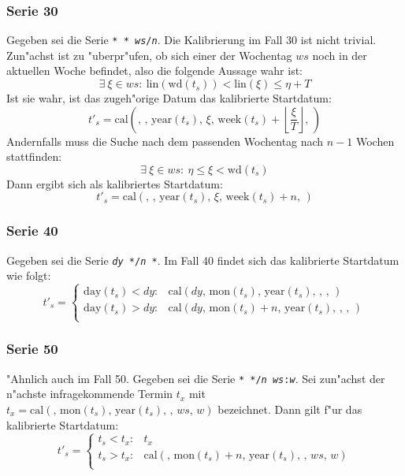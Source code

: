 \documentclass[a4paper]{article}
\newcommand*{\dayf}{\mathrm{day}}
\newcommand*{\monf}{\mathrm{mon}}
\newcommand*{\yearf}{\mathrm{year}}
\newcommand*{\wdf}{\mathrm{wd}}
\newcommand*{\weekf}{\mathrm{week}}
\newcommand*{\linf}{\mathrm{lin}}
\newcommand*{\calf}{\mathrm{cal}}
\numberwithin{equation}{section}
\begin{document}
\subsubsection{Serie 30}
Gegeben sei die Serie \texttt{* * \textit{ws}/\textit{n}}. Die Kalibrierung im
Fall 30 ist nicht trivial. Zun"achst ist zu "uberpr"ufen, ob sich einer der
Wochentag $ws$ noch in der aktuellen Woche befindet, also die folgende Aussage
wahr ist:
\begin{equation}
  \exists\ \xi \in ws :\ \linf(\wdf(t_s)) < \linf(\xi) \le \eta + T
\end{equation}
Ist sie wahr, ist das zugeh"orige Datum das kalibrierte Startdatum:
\begin{equation}
  t'_s = \calf(,\,,\,\yearf(t_s),\,\xi,\,\weekf(t_s) +
    \left\lfloor\frac{\xi}{T}\right\rfloor,\,)
\end{equation}
Andernfalls muss die Suche nach dem passenden Wochentag nach $n - 1$ Wochen
stattfinden:
\begin{equation}\exists\ \xi \in ws :\ \eta \le \xi < \wdf(t_s)\end{equation}
Dann ergibt sich als kalibriertes Startdatum:
\begin{equation}
  t'_s = \calf(,\,,\,\yearf(t_s),\,\xi,\,\weekf(t_s) + n,\,)
\end{equation}

\subsubsection{Serie 40}
Gegeben sei die Serie \texttt{\textit{dy} */\textit{n} *}. Im Fall 40 findet
sich das kalibrierte Startdatum wie folgt:
\begin{equation}
  t'_s = \left\{\begin{array}{ll}
      \dayf(t_s) < dy: & \calf(dy,\,\monf(t_s),\,\yearf(t_s),\,,\,,\,) \\
      \dayf(t_s) > dy: & \calf(dy,\,\monf(t_s) + n,\,\yearf(t_s),\,,\,,\,) \\
    \end{array}\right.
\end{equation}

\subsubsection{Serie 50}
"Ahnlich auch im Fall 50. Gegeben sei die Serie
\texttt{* */\textit{n} \textit{ws}:\textit{w}}. Sei zun"achst der n"achste
infragekommende Termin $t_x$ mit
$t_x = \calf(,\,\monf(t_s),\,\yearf(t_s),\,,\,ws,\,w)$ bezeichnet. Dann gilt
f"ur das kalibrierte Startdatum:
\begin{equation}
  t'_s = \left\{\begin{array}{ll}
      t_s < t_x : & t_x \\
      t_s > t_x : & \calf(,\,\monf(t_s) + n,\,\yearf(t_s),\,,\,ws,\,w) \\
    \end{array}\right.
\end{equation}
\end{document}
